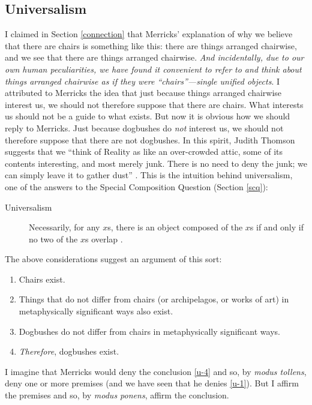 \documentclass[12pt,twoside]{reedfancy}
\begin{document}
\begin{spacing}{1.25}
\section{Universalism}
\label{universalism}
I claimed in Section \ref{connection} that Merricks' explanation of
why we believe that there are chairs is something like this: there are
things arranged chairwise, and we see that there are things arranged
chairwise.  {\em And incidentally, due to our own human peculiarities,
  we have found it convenient to refer to and think about things
  arranged chairwise as if they were ``chairs''---single unified
  objects}.  I attributed to Merricks the idea that just because
things arranged chairwise interest us, we should not therefore suppose
that there are chairs.  What interests us should not be a guide to
what exists.  But now it is obvious how we should reply to Merricks.
Just because dogbushes do {\em not} interest us, we should not
therefore suppose that there are not dogbushes.  In this spirit,
Judith Thomson suggests that we ``think of Reality as like an
over-crowded attic, some of its contents interesting, and most merely
junk.  There is no need to deny the junk; we can simply leave it to
gather dust'' \citep[167]{thomson1998a}.  This is the intuition behind
universalism, one of the answers to the Special Composition Question
(Section \ref{scq}):

\begin{description}
\item[Universalism] Necessarily, for any $x$s, there is an object
  composed of the $x$s if and only if no two of the $x$s overlap
  \citep[227]{markosian1998a}.
\end{description}

The above considerations suggest an argument of this sort:

\begin{enumerate}[ref=(\arabic*)]
  \item Chairs exist. \label{u-1}
  \item Things that do not differ from chairs (or archipelagos, or
    works of art) in metaphysically significant ways also exist.
  \item Dogbushes do not differ from chairs in metaphysically
    significant ways.
  \item {\em Therefore}, dogbushes exist. \label{u-4}
\end{enumerate}

I imagine that Merricks would deny the conclusion \ref{u-4} and so, by
{\em modus tollens}, deny one or more premises (and we have seen that
he denies \ref{u-1}).  But I affirm the premises and so, by {\em modus
  ponens}, affirm the conclusion.


\end{spacing}
\end{document}
